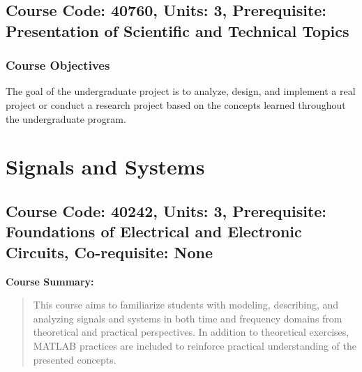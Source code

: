 \documentclass[12pt]{article}
\begin{document}
\subsection*{Course Code: 40760, Units: 3, Prerequisite: Presentation of Scientific and Technical Topics}

\subsubsection*{Course Objectives}
The goal of the undergraduate project is to analyze, design, and implement a real project or conduct a research project based on the concepts learned throughout the undergraduate program.

\newpage
\section{Signals and Systems}
\subsection*{Course Code: 40242, Units: 3, Prerequisite: Foundations of Electrical and Electronic Circuits, Co-requisite: None}

\textbf{Course Summary:} 
\begin{quote}
   This course aims to familiarize students with modeling, describing, and analyzing signals and systems in both time and frequency domains from theoretical and practical perspectives. In addition to theoretical exercises, MATLAB practices are included to reinforce practical understanding of the presented concepts.
\end{quote}
\end{document}
